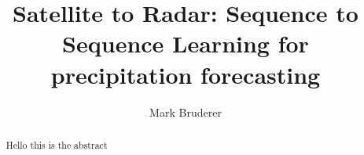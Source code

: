\documentclass[acmtog, authorversion]{acmart}
\begin{document}
\title{Satellite to Radar: Sequence to Sequence Learning for precipitation forecasting}


\author{Mark Bruderer}



\renewcommand{\shortauthors}{Mark Bruderer}

\begin{abstract}
  Hello this is the abstract
\end{abstract}

\end{document}
